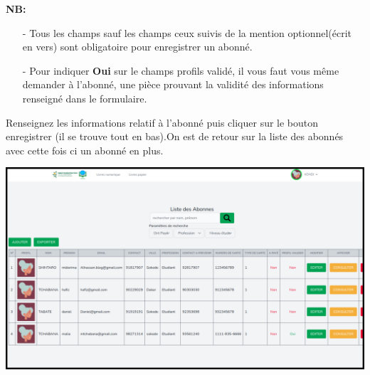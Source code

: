 \documentclass[12pt,a4paper]{article}
\begin{document}
\begin{itemize}
\begin{center}
\end{center}
\textbf{NB:} 
\begin{itemize}
\item[-] Tous les champs sauf les champs ceux suivis de la mention optionnel(écrit en vers) sont obligatoire pour enregistrer un abonné.
\item[-] Pour indiquer \textbf{Oui} sur le champs profils validé, il vous faut vous même demander à l'abonné,
une pièce prouvant la validité des informations renseigné dans le formulaire.
\end{itemize}

Renseignez les informations relatif à l'abonné puis cliquer sur le
bouton enregistrer (il se trouve tout en bas).On est de retour sur la liste des abonnés avec cette fois ci
un abonné en plus.\\
\begin{center}
\includegraphics[scale=0.33]{img/abonnes_liste2.png}
\end{center}


\end{itemize}
\end{document}
